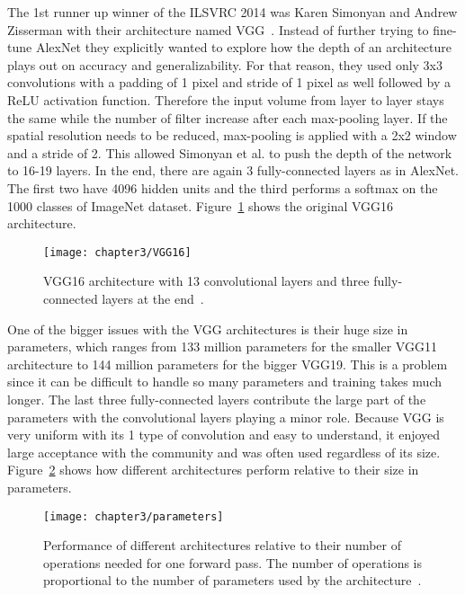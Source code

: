 The 1st runner up winner of the ILSVRC 2014 was Karen Simonyan and Andrew Zisserman with their architecture named VGG~\cite{simonyan2014very}. Instead of further trying to fine-tune AlexNet they explicitly wanted to explore how the depth of an architecture plays out on accuracy and generalizability. For that reason, they used only 3x3 convolutions with a padding of 1 pixel and stride of 1 pixel as well followed by a ReLU activation function. Therefore the input volume from layer to layer stays the same while the number of filter increase after each max-pooling layer. If the spatial resolution needs to be reduced, max-pooling is applied with a 2x2 window and a stride of 2. This allowed Simonyan et al. to push the depth of the network to 16-19 layers. In the end, there are again 3 fully-connected layers as in AlexNet. The first two have 4096 hidden units and the third performs a softmax on the 1000 classes of ImageNet dataset. Figure~\ref{fig:vgg16} shows the original VGG16 architecture.\\


\begin{figure}[!h]
  \centering
  \caption{VGG16 architecture with 13 convolutional layers and three fully-connected layers at the end~\cite{ferguson2017automatic}.}
  \texttt{[image: chapter3/VGG16]}
  \label{fig:vgg16}
\end{figure}

\quad

One of the bigger issues with the VGG architectures is their huge size in parameters, which ranges from 133 million parameters for the smaller VGG11 architecture to 144 million parameters for the bigger VGG19. This is a problem since it can be difficult to handle so many parameters and training takes much longer. The last three fully-connected layers contribute the large part of the parameters with the convolutional layers playing a minor role. Because VGG is very uniform with its 1 type of convolution and easy to understand, it enjoyed large acceptance with the community and was often used regardless of its size. Figure~\ref{fig:parameters} shows how different architectures perform relative to their size in parameters.


\begin{figure}[!h]
  \centering
  \caption{Performance of different architectures relative to their number of operations needed for one forward pass. The number of operations is proportional to the number of parameters used by the architecture~\cite{canziani2016analysis}.}
  \texttt{[image: chapter3/parameters]}
  \label{fig:parameters}
\end{figure}


